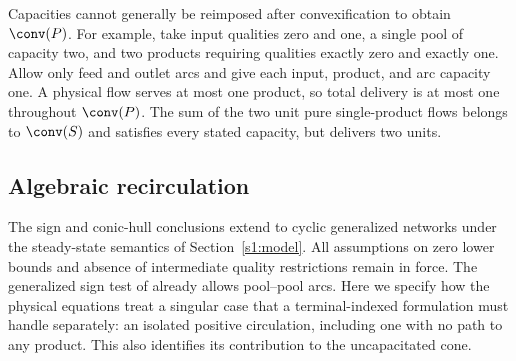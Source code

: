 Capacities cannot generally be reimposed after convexification to obtain
$\conv(P)$. For example, take input qualities zero and one, a single
pool of capacity two, and two products requiring qualities exactly zero
and exactly one. Allow only feed and outlet arcs and give each input,
product, and arc capacity one. A physical flow serves at most one
product, so total delivery is at most one throughout $\conv(P)$.
The sum of the two unit pure single-product flows belongs to
$\conv(S)$ and satisfies every stated capacity, but delivers two units.

\subsection{Algebraic recirculation}\label{s1:cycles}

The sign and conic-hull conclusions extend to cyclic generalized
networks under the steady-state semantics of
Section~\ref{s1:model}. All assumptions on zero lower bounds and
absence of intermediate quality restrictions remain in force.
The generalized sign test of \citet{xiang2026-dive-and-fix} already
allows pool--pool arcs. Here we specify how the physical equations
treat a singular case that a terminal-indexed formulation must handle
separately: an isolated positive circulation, including one with no
path to any product. This also identifies its contribution to the
uncapacitated cone.

